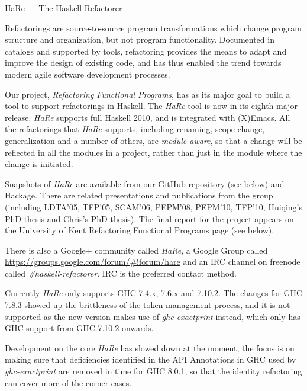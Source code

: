 \documentclass[DIV16,twocolumn,10pt]{scrreprt}
\begin{document}
\begin{hcarentry}[updated]{HaRe --- The Haskell Refactorer}
\label{hare}
\makeheader

Refactorings are source-to-source program transformations which change
program structure and organization, but not program functionality.
Documented in catalogs and supported by tools, refactoring provides
the means to adapt and improve the design of existing code, and has
thus enabled the trend towards modern agile software development
processes.

Our project, \emph{Refactoring Functional Programs}, has as its major
goal to build a tool to support refactorings in Haskell. The \emph{HaRe} tool
is now in its eighth major release. \emph{HaRe} supports full Haskell 2010,
and is integrated with (X)Emacs. All the refactorings that \emph{HaRe}
supports, including renaming, scope change, generalization and a
number of others, are \emph{module-aware}, so that a change will be
reflected in all the modules in a project, rather than just in the
module where the change is initiated.

Snapshots of \emph{HaRe} are available from our GitHub repository (see below)
and Hackage. There are related presentations and publications from the
group (including LDTA'05, TFP'05, SCAM'06, PEPM'08, PEPM'10, TFP'10,
Huiqing's PhD thesis and Chris's PhD thesis). The final report for the
project appears on the University of Kent Refactoring Functional
Programs page (see below).

There is also a Google+ community called \emph{HaRe}, a Google Group called
\url{https://groups.google.com/forum/#!forum/hare} and an IRC channel on
freenode called \emph{\#haskell-refactorer}. IRC is the preferred contact method.

Currently \emph{HaRe} only supports GHC 7.4.x, 7.6.x and 7.10.2. The changes for GHC
7.8.3 showed up the brittleness of the token management process, and it is not
supported as the new version makes use of \emph{ghc-exactprint} instead, which
only has GHC support from GHC 7.10.2 onwards. 

Development on the core \emph{HaRe} has slowed down at the moment, the focus is on
making sure that deficiencies identified in the API Annotations in GHC used by
\emph{ghc-exactprint} are removed in time for GHC 8.0.1, so that the identity
refactoring can cover more of the corner cases.


\end{hcarentry}
\end{document}

